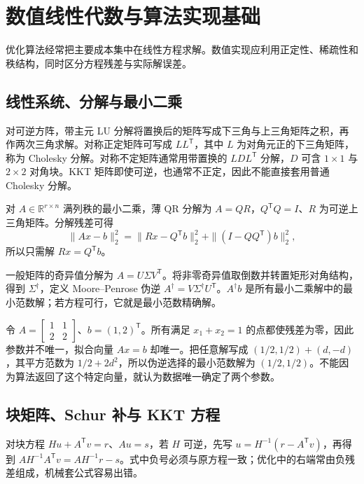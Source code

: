 \documentclass[UTF8,12pt,a4paper,fontset=fandol]{ctexbook}
\begin{document}
\chapter{数值线性代数与算法实现基础}
\label{app:co-numerical}

优化算法经常把主要成本集中在线性方程求解。数值实现应利用正定性、稀疏性和秩结构，同时区分方程残差与实际解误差。

\section{线性系统、分解与最小二乘}

对可逆方阵，带主元 LU 分解将置换后的矩阵写成下三角与上三角矩阵之积，再作两次三角求解。对称正定矩阵可写成 $LL^{\mathsf T}$，其中 $L$ 为对角元正的下三角矩阵，称为 Cholesky 分解。对称不定矩阵通常用带置换的 $LDL^{\mathsf T}$ 分解，$D$ 可含 $1\times1$ 与 $2\times2$ 对角块。KKT 矩阵即使可逆，也通常不正定，因此不能直接套用普通 Cholesky 分解。

对 $A\in\mathbb R^{r\times n}$ 满列秩的最小二乘，薄 QR 分解为 $A=QR$，$Q^{\mathsf T}Q=I$、$R$ 为可逆上三角矩阵。分解残差可得
\[
 \|Ax-b\|_2^2=\|Rx-Q^{\mathsf T}b\|_2^2+\|(I-QQ^{\mathsf T})b\|_2^2,
\]
所以只需解 $Rx=Q^{\mathsf T}b$。

一般矩阵的奇异值分解为 $A=U\Sigma V^{\mathsf T}$。将非零奇异值取倒数并转置矩形对角结构，得到 $\Sigma^\dagger$，定义 Moore--Penrose 伪逆 $A^\dagger=V\Sigma^\dagger U^{\mathsf T}$。$A^\dagger b$ 是所有最小二乘解中的最小范数解；若方程可行，它就是最小范数精确解。

\begin{example}[秩亏时拟合值可以唯一而参数不唯一]
令 $A=\left[\begin{smallmatrix}1&1\\2&2\end{smallmatrix}\right]$、$b=(1,2)^{\mathsf T}$。所有满足 $x_1+x_2=1$ 的点都使残差为零，因此参数并不唯一，拟合向量 $Ax=b$ 却唯一。把任意解写成 $(1/2,1/2)+(d,-d)$，其平方范数为 $1/2+2d^2$，所以伪逆选择的最小范数解为 $(1/2,1/2)$。不能因为算法返回了这个特定向量，就认为数据唯一确定了两个参数。
\end{example}

\section{块矩阵、Schur 补与 KKT 方程}

对块方程 $Hu+A^{\mathsf T}v=r$、$Au=s$，若 $H$ 可逆，先写 $u=H^{-1}(r-A^{\mathsf T}v)$，再得到 $AH^{-1}A^{\mathsf T}v=AH^{-1}r-s$。式中负号必须与原方程一致；优化中的右端常由负残差组成，机械套公式容易出错。
\end{document}
